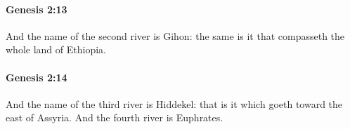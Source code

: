 		\paragraph{Genesis 2:13} %
			\label{GENESIS-2-13}

			And the name of the second river is Gihon: the same is it that compasseth the whole land of Ethiopia.


		\paragraph{Genesis 2:14} %
			\label{GENESIS-2-14}

			And the name of the third river is Hiddekel: that is it which goeth toward the east of Assyria. And the fourth river is Euphrates.


